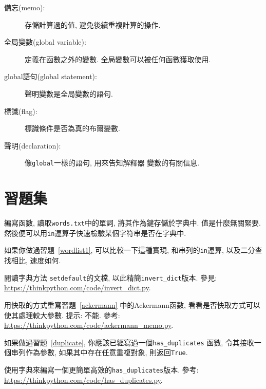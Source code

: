 \documentclass[10pt]{book}
\begin{document}
\begin{description}
\item[備忘(memo):] 存儲計算過的值, 避免後續重複計算的操作. 

\item[全局變數(global variable):] 定義在函數之外的變數. 
全局變數可以被任何函數獲取使用. 

\item[global語句(global statement):] 聲明變數是全局變數的語句.

\item[標識(flag):] 標識條件是否為真的布爾變數. 

\item[聲明(declaration):] 像{\tt global}一樣的語句, 用來告知解釋器
變數的有關信息. 

\end{description}


\section{習題集}

\begin{exercise}
\label{wordlist2}

編寫函數, 讀取{\tt words.txt}中的單詞, 
將其作為鍵存儲於字典中. 值是什麼無關緊要. 
然後便可以用{\tt in}運算子快速檢驗某個字符串是否在字典中. 

如果你做過習題~\ref{wordlist1}, 可以比較一下這種實現, 和串列的{\tt in}運算, 
以及二分查找相比, 速度如何. 

\end{exercise}


\begin{exercise}
\label{setdefault}
閱讀字典方法 {\tt setdefault}的文檔, 
以此精簡\verb"invert_dict"版本. 
參見: \url{https://thinkpython.com/code/invert_dict.py}.

\end{exercise}


\begin{exercise}
用快取的方式重寫習題~\ref{ackermann} 中的Ackermann函數, 
看看是否快取方式可以使其處理較大參數. 
提示: 不能.
參考: \url{https://thinkpython.com/code/ackermann_memo.py}.

\end{exercise}


\begin{exercise}
如果做過習題~\ref{duplicate}, 你應該已經寫過一個\verb"has_duplicates" 函數, 
令其接收一個串列作為參數, 如果其中存在任意重複對象, 則返回{\tt True}.

使用字典來編寫一個更簡單高效的\verb"has_duplicates"版本. 
參考: \url{https://thinkpython.com/code/has_duplicates.py}.
\end{exercise}
\end{document}
